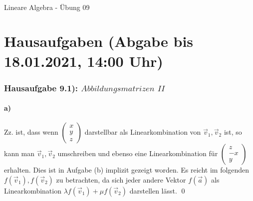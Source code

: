 \documentclass[titlepage]{article}
\newcommand{\1}{\mathbb{1}}
\newcommand{\0}{\mathbb{0}}
\newcommand{\vecD}[3]{\left(\begin{smallmatrix}#1\\#2\\#3\end{smallmatrix}\right)}
\begin{document}
	
	\begin{center}
		\hrulefill\\
		\begin{center}
			\LARGE Lineare Algebra - Übung 09 \normalsize\\
		\end{center}
		\hrulefill
		\date{\today}
	\end{center}
	
	\part*{Hausaufgaben (Abgabe bis 18.01.2021, 14:00 Uhr)}
	\section*{Hausaufgabe 9.1): $Abbildungsmatrizen$ $II$}
		\subsection*{a)}
			Zz. ist, dass wenn $\vecD{x}{y}{z}$ darstellbar als Linearkombination von $\vec{v}_1,\vec{v}_2$ ist, so kann man $\vec{v}_1,\vec{v}_2$ umschreiben und ebenso eine Linearkombination für $\vecD{z}{-x}{y}$ erhalten. Dies ist in Aufgabe (b) implizit gezeigt worden. Es reicht im folgenden $f(\vec{v}_1),f(\vec{v}_2)$ zu betrachten, da sich jeder andere Vektor $f(\vec{a})$ als Linearkombination $\lambda f(\vec{v}_1)+\mu f(\vec{v}_2)$ darstellen lässt. \qed
\end{document}
